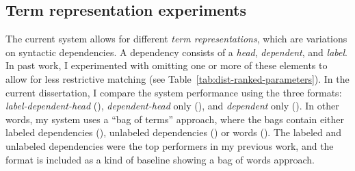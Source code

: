 \subsection{Term representation experiments}
\label{sec:exp-term-reps}
The current system allows for different \textit{term representations}, which are variations on syntactic dependencies. A dependency consists of a \textit{head}, \textit{dependent}, and \textit{label}. In past work, I experimented with omitting one or more of these elements to allow for less restrictive matching (see Table~\ref{tab:dist-ranked-parameters}). In the current dissertation, I compare the system performance using the three formats: \textit{label-dependent-head} (), \textit{dependent-head} only (), and \textit{dependent} only (). In other words, my system uses a ``bag of terms'' approach, where the bags contain either labeled dependencies (), unlabeled dependencies () or words (). The labeled and unlabeled dependencies were the top performers in my previous work, and the  format is included as a kind of baseline showing a bag of words approach.

